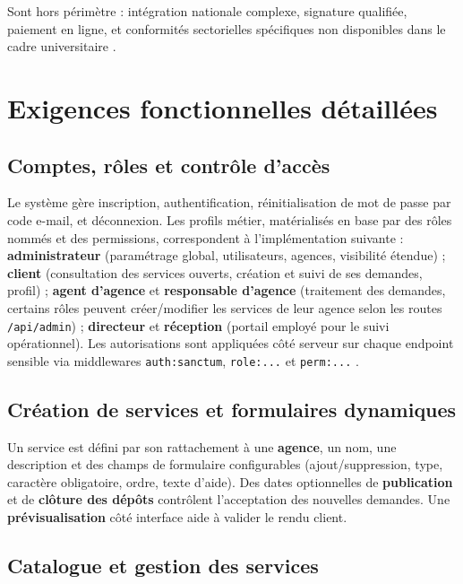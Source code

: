 Sont hors périmètre : intégration nationale complexe, signature qualifiée, paiement en ligne, et conformités sectorielles spécifiques non disponibles dans le cadre universitaire \cite{iso25010}.

\section{Exigences fonctionnelles détaillées}

\subsection{Comptes, rôles et contrôle d'accès}

Le système gère inscription, authentification, réinitialisation de mot de passe par code e-mail, et déconnexion. Les profils métier, matérialisés en base par des rôles nommés et des permissions, correspondent à l'implémentation suivante : \textbf{administrateur} (paramétrage global, utilisateurs, agences, visibilité étendue) ; \textbf{client} (consultation des services ouverts, création et suivi de ses demandes, profil) ; \textbf{agent d'agence} et \textbf{responsable d'agence} (traitement des demandes, certains rôles peuvent créer/modifier les services de leur agence selon les routes \texttt{/api/admin}) ; \textbf{directeur} et \textbf{réception} (portail employé pour le suivi opérationnel). Les autorisations sont appliquées côté serveur sur chaque endpoint sensible via middlewares \texttt{auth:sanctum}, \texttt{role:...} et \texttt{perm:...} \cite{owasp2021,sanctumdoc}.

\subsection{Création de services et formulaires dynamiques}

Un service est défini par son rattachement à une \textbf{agence}, un nom, une description et des champs de formulaire configurables (ajout/suppression, type, caractère obligatoire, ordre, texte d'aide). Des dates optionnelles de \textbf{publication} et de \textbf{clôture des dépôts} contrôlent l'acceptation des nouvelles demandes. Une \textbf{prévisualisation} côté interface aide à valider le rendu client.

\subsection{Catalogue et gestion des services}

